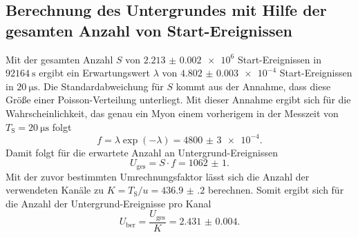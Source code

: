 \subsection{Berechnung des Untergrundes mit Hilfe der gesamten Anzahl von Start-Ereignissen}
Mit der gesamten Anzahl $S$ von $\num{2.213(2)e6}$ Start-Ereignissen in $\SI{92164}{\second}$ ergibt ein Erwartungswert $\lambda$ von $\num{4.802(3)e-4}$ Start-Ereignissen in $\SI{20}{\micro\second}$. Die Standardabweichung für $S$ kommt aus der Annahme, dass diese Größe einer Poisson-Verteilung unterliegt. Mit dieser Annahme ergibt sich für die Wahrscheinlichkeit, das genau ein Myon einem vorherigem in der Messzeit von $T_\text{S}=\SI{20}{\micro\second}$ folgt 
\begin{displaymath}
f=\lambda \exp(-\lambda)=\num{4800(3)e-4}.
\end{displaymath}
Damit folgt für die erwartete Anzahl an Untergrund-Ereignissen
\begin{displaymath}
U_\text{ges}=S \cdot f =\num{1062(1)}.
\end{displaymath}
Mit der zuvor bestimmten Umrechnungsfaktor lässt sich die Anzahl der verwendeten Kanäle zu $K=T_\text{S} / u=\num{436.9(2)}$ berechnen.
Somit ergibt sich für die Anzahl der Untergrund-Ereignisse pro Kanal
\begin{displaymath}
U_\text{ber}=\frac{U_\text{ges}}{K} =\num{2.431(4)}.
\end{displaymath}


